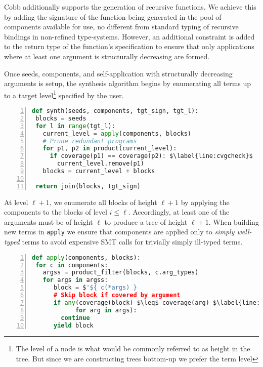 \documentclass[review, sigplan]{acmart}
\begin{document}

Cobb additionally supports the generation of recursive functions.
We achieve this by adding the signature of the function being
generated in the pool of components available for use,
no different from standard typing of recursive bindings in non-refined
type-systems.
However, an additional constraint is added to the return type
of the function's specification to ensure that only applications
where at least one argument is structurally decreasing are formed.


Once seeds, components, and self-application with structurally decreasing
arguments is setup, the synthesis algorithm begins by enumerating
all terms up to a target level\footnote{The level of a node is what would
be commonly referred to as height in the tree. But since
we are constructing trees bottom-up we prefer the term level} specified by the user.
\begin{lstlisting}[language=Python, basicstyle=\small\ttfamily, mathescape, numbers=left, numbersep=3pt]
def synth(seeds, components, tgt_sign, tgt_l):
 blocks = seeds
 for l in range(tgt_l):
   current_level = apply(components, blocks)
   # Prune redundant programs
   for p1, p2 in product(current_level):
     if coverage(p1) == coverage(p2): $\label{line:cvgcheck}$
       current_level.remove(p1)
   blocks = current_level + blocks

 return join(blocks, tgt_sign)
\end{lstlisting}
At level $\ell + 1$, we enumerate all blocks of height $\ell + 1$ by applying
the components to the blocks of level $i \leq \ell$.
Accordingly, at least one of the arguments must be of height $\ell$ to produce
a tree of height $\ell + 1$.
When building new terms in \lstinline[basicstyle=\small\ttfamily]|apply|
we ensure that components are applied only to \emph{simply well-typed} terms
to avoid expensive SMT calls for trivially simply ill-typed terms.

\begin{lstlisting}[language=Python, basicstyle=\small\ttfamily, mathescape, numbers=left, numbersep=3pt]
def apply(components, blocks):
 for c in components:
   argss = product_filter(blocks, c.arg_types)
   for args in argss:
      block = $'${ c(*args) }
      # Skip block if covered by argument
      if any(coverage(block) $\leq$ coverage(arg) $\label{line:cvginc}$
            for arg in args):
        continue
      yield block
\end{lstlisting}
\end{document}
